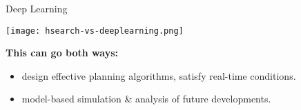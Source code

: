 \begin{frame}{Deep Learning}

{\small

\medskip

{\centering

\texttt{[image: hsearch-vs-deeplearning.png]} 

}

\medskip \pause

\textbf{This can go both ways:}

\begin{itemize}
\item {} design effective planning algorithms, 
satisfy real-time conditions.
\item {} model-based simulation \& analysis of 
future developments.
\end{itemize}

\pause


\medskip 


}

\bigskip

\end{frame}



